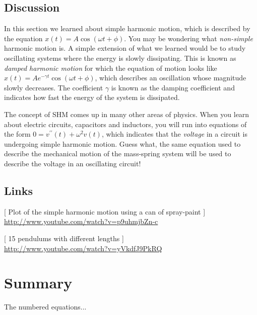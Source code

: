 \documentclass[letterpaper,9pt,journal]{IEEEtran}
\newcommand{\dokuitalic}[1]{\textsl{#1}}
\begin{document}
\subsection{Discussion}
\label{bd8bc36eb41bc90c585ae7e902e9e284}%

In this section we learned about simple harmonic motion, which is described by the equation $x(t)=A\cos(\omega t + \phi)$.
You may be wondering what \dokuitalic{non-simple} harmonic motion is.
A simple extension of what we learned would be to study oscillating systems where the energy is slowly dissipating.
This is known as \dokuitalic{damped harmonic motion} for which the equation of motion looks like $x(t)=Ae^{-\gamma t}\cos(\omega t + \phi)$, which describes an oscillation whose magnitude slowly decreases. The coefficient $\gamma$ is known as the damping
coefficient and indicates how fast the energy of the system is dissipated.

The concept of SHM comes up in many other areas of physics.
When you learn about electric circuits, capacitors and inductors, you will run into
equations of the form $0 = v^{\prime\prime}(t)+\omega^2 v(t)$,
which indicates that the \dokuitalic{voltage} in a circuit is undergoing simple harmonic motion. 
Guess what, the same equation used to describe the mechanical motion of the mass-spring system
will be used to describe the voltage in an oscillating circuit!


\subsection{Links}
\label{807765384d9d5527da8848df14a4f02f}%

[ Plot of the simple harmonic motion using a can of spray-paint ] \\ 
\href{http://www.youtube.com/watch?v=p9uhmjbZn-c}{http://www.youtube.com/watch?v=p9uhmjbZn-c}

[ 15 pendulums with different lengths ] \\ 
\href{http://www.youtube.com/watch?v=yVkdfJ9PkRQ}{http://www.youtube.com/watch?v=yVkdfJ9PkRQ}








\section{Summary}



The numbered equations...
\end{document}
